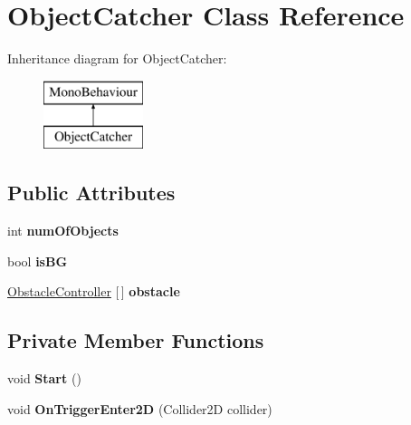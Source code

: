 \hypertarget{class_object_catcher}{}\section{Object\+Catcher Class Reference}
\label{class_object_catcher}
Inheritance diagram for Object\+Catcher\+:\begin{figure}[H]
\begin{center}
\leavevmode
\includegraphics[height=2.000000cm]{class_object_catcher}
\end{center}
\end{figure}
\subsection*{Public Attributes}
\begin{DoxyCompactItemize}
\item 
\hypertarget{class_object_catcher_a22afa0fcd7d90d5fe29ba0d8ef5d5eb5}{}\label{class_object_catcher_a22afa0fcd7d90d5fe29ba0d8ef5d5eb5} 
int {\bfseries num\+Of\+Objects}
\item 
\hypertarget{class_object_catcher_a51ebcec3a6f67ea880cd03710c837f9a}{}\label{class_object_catcher_a51ebcec3a6f67ea880cd03710c837f9a} 
bool {\bfseries is\+BG}
\item 
\hypertarget{class_object_catcher_ade964849c38af5011cc9153cc878f73e}{}\label{class_object_catcher_ade964849c38af5011cc9153cc878f73e} 
\hyperlink{class_obstacle_controller}{Obstacle\+Controller} \mbox{[}$\,$\mbox{]} {\bfseries obstacle}
\end{DoxyCompactItemize}
\subsection*{Private Member Functions}
\begin{DoxyCompactItemize}
\item 
\hypertarget{class_object_catcher_a1cb46d1abae53ad24af42e6424e7dacf}{}\label{class_object_catcher_a1cb46d1abae53ad24af42e6424e7dacf} 
void {\bfseries Start} ()
\item 
\hypertarget{class_object_catcher_a38c8900fa3ce76033df16957527f409c}{}\label{class_object_catcher_a38c8900fa3ce76033df16957527f409c} 
void {\bfseries On\+Trigger\+Enter2D} (Collider2D collider)
\end{DoxyCompactItemize}
